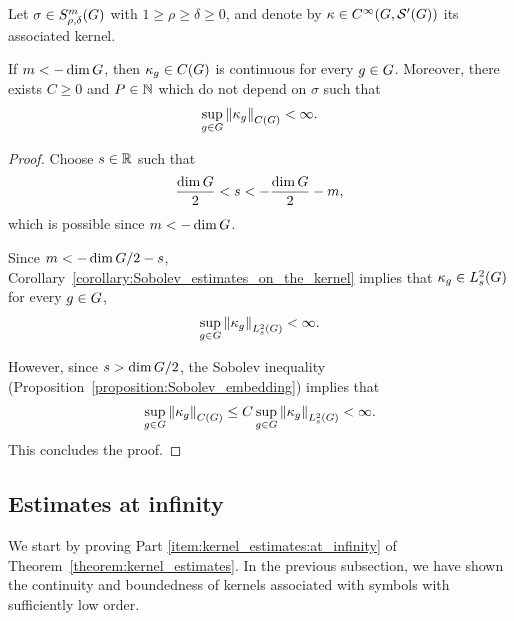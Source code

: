 \begin{corollary}
\label{corollary:kernel_estimates:at_origin:negative}
    Let $\sigma \in \SymbolClass m {\rho,\delta}$ with $1 \geq \rho \geq \delta \geq 0$,
    and denote by $\kappa \in \SmoothFunctions {\Group, \TemperedDistributions \Group}$ its associated kernel.

    If $m < -\dim \Group$,
    then $\kappa_g \in \ContinuousFunctions \Group$ is continuous for every $g \in \Group$.
    Moreover, there exists $C \geq 0$ and $P \in \N$ which do not depend on $\sigma$ such that
    \begin{align*}
        \sup_{g \in \Group} \norm [\ContinuousFunctions \Group] {\kappa_g} < \infty.
    \end{align*}
\end{corollary}
\begin{proof}
    Choose $s \in \R$ such that
    \begin{align*}
        \frac {\dim \Group} 2 < s < -\frac {\dim \Group} 2 - m,
    \end{align*}
    which is possible since $m < -\dim \Group$.

    Since $m < -\dim \Group/2 - s$,
    Corollary~\ref{corollary:Sobolev_estimates_on_the_kernel} implies that
    $\kappa_g \in \Sobolev s$ for every $g \in \Group$,
    \begin{align*}
        \sup_{g \in \Group} \norm [\Sobolev s] {\kappa_g} < \infty.
    \end{align*}

    However,
    since $s > \dim \Group / 2$,
    the Sobolev inequality (Proposition~\ref{proposition:Sobolev_embedding})
    implies that
    \begin{align*}
        \sup_{g \in \Group} \norm [\ContinuousFunctions \Group] {\kappa_g}
        \leq C \sup_{g \in \Group} \norm [\Sobolev s] {\kappa_g} < \infty.
    \end{align*}
    This concludes the proof.
\end{proof}

\subsection{Estimates at infinity}

We start by proving Part \ref{item:kernel_estimates:at_infinity} of Theorem~\ref{theorem:kernel_estimates}.
In the previous subsection,
we have shown the continuity and boundedness of kernels associated with symbols with sufficiently low order.

